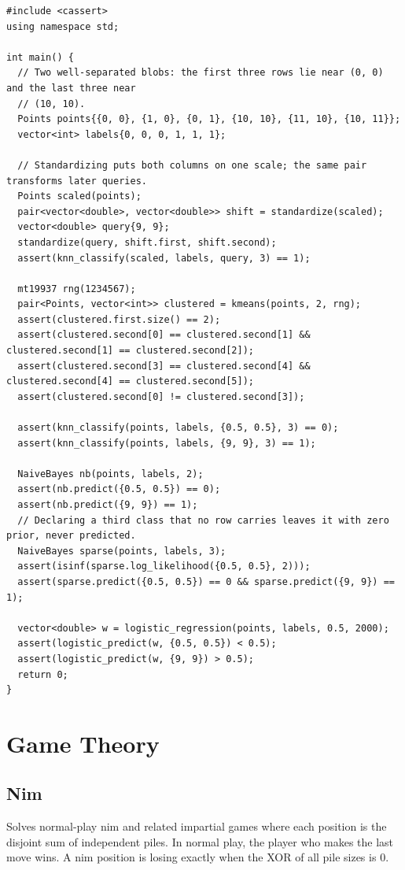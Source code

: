 \begin{lstlisting}[style=cpp]
#include <cassert>
using namespace std;

int main() {
  // Two well-separated blobs: the first three rows lie near (0, 0) and the last three near
  // (10, 10).
  Points points{{0, 0}, {1, 0}, {0, 1}, {10, 10}, {11, 10}, {10, 11}};
  vector<int> labels{0, 0, 0, 1, 1, 1};

  // Standardizing puts both columns on one scale; the same pair transforms later queries.
  Points scaled(points);
  pair<vector<double>, vector<double>> shift = standardize(scaled);
  vector<double> query{9, 9};
  standardize(query, shift.first, shift.second);
  assert(knn_classify(scaled, labels, query, 3) == 1);

  mt19937 rng(1234567);
  pair<Points, vector<int>> clustered = kmeans(points, 2, rng);
  assert(clustered.first.size() == 2);
  assert(clustered.second[0] == clustered.second[1] && clustered.second[1] == clustered.second[2]);
  assert(clustered.second[3] == clustered.second[4] && clustered.second[4] == clustered.second[5]);
  assert(clustered.second[0] != clustered.second[3]);

  assert(knn_classify(points, labels, {0.5, 0.5}, 3) == 0);
  assert(knn_classify(points, labels, {9, 9}, 3) == 1);

  NaiveBayes nb(points, labels, 2);
  assert(nb.predict({0.5, 0.5}) == 0);
  assert(nb.predict({9, 9}) == 1);
  // Declaring a third class that no row carries leaves it with zero prior, never predicted.
  NaiveBayes sparse(points, labels, 3);
  assert(isinf(sparse.log_likelihood({0.5, 0.5}, 2)));
  assert(sparse.predict({0.5, 0.5}) == 0 && sparse.predict({9, 9}) == 1);

  vector<double> w = logistic_regression(points, labels, 0.5, 2000);
  assert(logistic_predict(w, {0.5, 0.5}) < 0.5);
  assert(logistic_predict(w, {9, 9}) > 0.5);
  return 0;
}
\end{lstlisting}

\section{\texorpdfstring{Game Theory}{6.8 Game Theory}}
\setcounter{section}{8}
\setcounter{subsection}{0}
\subsection{Nim}
\label{sec:6.8.1}
Solves normal-play nim and related impartial games where each position is the disjoint sum of independent piles. In normal play, the player who makes the last move wins. A nim position is losing exactly when the XOR of all pile sizes is $0$.

